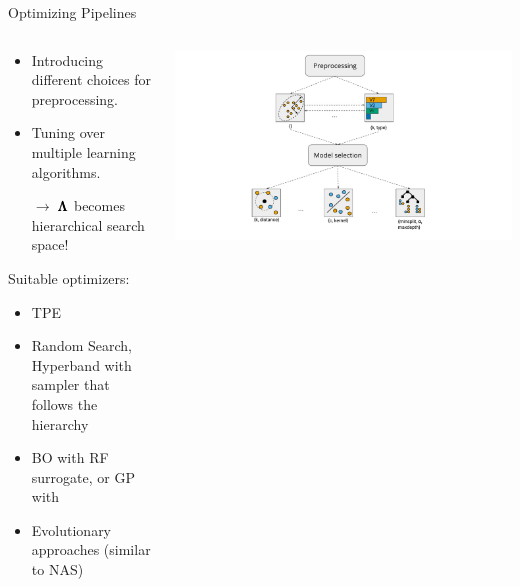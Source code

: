 \begin{frame}{Optimizing Pipelines}

  \begin{columns}
    \begin{column}{0.6\textwidth}
      \vspace*{-0.5em}
      \begin{itemize}
        \item Introducing different choices for preprocessing.
        \item Tuning over multiple learning algorithms.
        \item[$\rightarrow$] $\pmb{\Lambda}$ becomes hierarchical search space!
      \end{itemize}
      
      \vspace*{0.5em}

      Suitable optimizers:
      \begin{itemize}
        \item TPE
        \item Random Search, Hyperband with sampler that follows the hierarchy
        \item BO with RF surrogate, or GP with 
        \item Evolutionary approaches (similar to NAS)
      \end{itemize}

    \end{column}%
    \begin{column}{0.4\textwidth}
      \begin{center}
        \includegraphics[width = \textwidth, trim=160 0 160 5, clip]{images/dag.pdf}
      \end{center}
    \end{column}
  \end{columns}
\end{frame}

